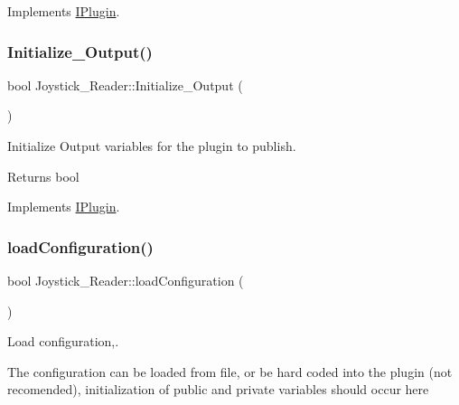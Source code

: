 Implements \hyperlink{class_i_plugin_aa7c66743ad956d8ada57becee559af4d}{I\+Plugin}.

\mbox{\label{class_joystick___reader_ab57adbf1ffe66ec0eaf10601253a3116}} 
\subsubsection{\texorpdfstring{Initialize\+\_\+\+Output()}{Initialize\_Output()}}
{\footnotesize\ttfamily bool Joystick\+\_\+\+Reader\+::\+Initialize\+\_\+\+Output (\begin{DoxyParamCaption}{ }\end{DoxyParamCaption})\hspace{0.3cm}{\ttfamily [virtual]}}



Initialize Output variables for the plugin to publish. 

\begin{DoxyReturn}{Returns}
bool 
\end{DoxyReturn}


Implements \hyperlink{class_i_plugin_a0b772513fc8c4ed01240e19c4bb84068}{I\+Plugin}.

\mbox{\label{class_joystick___reader_a906c6bb884e18a17d22edcfebe73a4b2}} 
\subsubsection{\texorpdfstring{load\+Configuration()}{loadConfiguration()}}
{\footnotesize\ttfamily bool Joystick\+\_\+\+Reader\+::load\+Configuration (\begin{DoxyParamCaption}{ }\end{DoxyParamCaption})\hspace{0.3cm}{\ttfamily [virtual]}}



Load configuration,. 

The configuration can be loaded from file, or be hard coded into the plugin (not recomended), initialization of public and private variables should occur here

